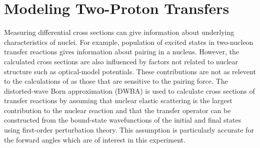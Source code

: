 \section{Modeling Two-Proton Transfers}

Measuring differential cross sections can give information about underlying characteristics of nuclei.  For example, population of excited \zp states in two-nucleon transfer reactions gives information about pairing in a nucleus.  However, the calculated cross sections are also influenced by factors not related to nuclear structure such as optical-model potentials.  These contributions are not as relevent to the calculations of \NME as those that are sensitive to the pairing force.  The distorted-wave Born approximation (DWBA) is used to calculate cross sections of transfer reactions by assuming that nuclear elastic scattering is the largest contribution to the nuclear reaction and that the transfer operator can be constructed from the bound-state wavefunctions of the initial and final states using first-order perturbation theory.  This assumption is particularly accurate for the forward angles which are of interest in this experiment.

